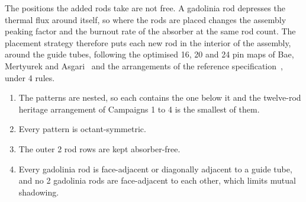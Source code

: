 The positions the added rods take are not free. A gadolinia rod
depresses the thermal flux around itself, so where the rods are placed
changes the assembly peaking factor and the burnout rate of the
absorber at the same rod count. The placement strategy therefore puts
each new rod in the interior of the assembly, around the guide tubes,
following
the optimised 16, 20 and 24 pin maps of Bae, Mertyurek and
Asgari~\cite{bae_gd_2023} and the arrangements of the reference
specification~\cite{nuscale_htp2_2017,epr_fsar_ch4}, under 4 rules.

\begin{enumerate}
  \item The patterns are nested, so each contains the one below it and
        the twelve-rod heritage arrangement of Campaigns 1 to 4 is the
        smallest of them.
  \item Every pattern is octant-symmetric.
  \item The outer 2 rod rows are kept absorber-free.
  \item Every gadolinia rod is face-adjacent or diagonally adjacent to
        a guide tube, and no 2 gadolinia rods are face-adjacent to
        each other, which limits mutual shadowing.
\end{enumerate}

